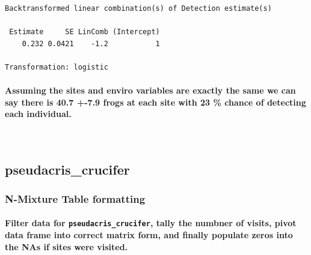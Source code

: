 \documentclass[
  letterpaper,
  DIV=11,
  numbers=noendperiod]{scrartcl}
\let\oldparagraph\paragraph
\renewcommand{\paragraph}[1]{\oldparagraph{#1}\mbox{}}
\begin{document}
\begin{verbatim}
Backtransformed linear combination(s) of Detection estimate(s)

 Estimate     SE LinComb (Intercept)
    0.232 0.0421    -1.2           1

Transformation: logistic 
\end{verbatim}

\hypertarget{assuming-the-sites-and-enviro-variables-are-exactly-the-same-we-can-say-there-is-40.7--7.9-frogs-at-each-site-with-23-chance-of-detecting-each-individual.}{%
\paragraph{Assuming the sites and enviro variables are exactly the same
we can say there is 40.7 +-7.9 frogs at each site with 23 \% chance of
detecting each
individual.}\label{assuming-the-sites-and-enviro-variables-are-exactly-the-same-we-can-say-there-is-40.7--7.9-frogs-at-each-site-with-23-chance-of-detecting-each-individual.}}

\newpage

\(~\)

\hypertarget{pseudacris_crucifer}{%
\subsection{pseudacris\_crucifer}\label{pseudacris_crucifer}}

\hypertarget{n-mixture-table-formatting-1}{%
\subsubsection{N-Mixture Table
formatting}\label{n-mixture-table-formatting-1}}

\hypertarget{filter-data-for-pseudacris_crucifer-tally-the-numbner-of-visits-pivot-data-frame-into-correct-matrix-form-and-finally-populate-zeros-into-the-nas-if-sites-were-visited.}{%
\paragraph{\texorpdfstring{Filter data for
\texttt{pseudacris\_crucifer}, tally the numbner of visits, pivot data
frame into correct matrix form, and finally populate zeros into the NAs
if sites were
visited.}{Filter data for pseudacris\_crucifer, tally the numbner of visits, pivot data frame into correct matrix form, and finally populate zeros into the NAs if sites were visited.}}\label{filter-data-for-pseudacris_crucifer-tally-the-numbner-of-visits-pivot-data-frame-into-correct-matrix-form-and-finally-populate-zeros-into-the-nas-if-sites-were-visited.}}
\end{document}
